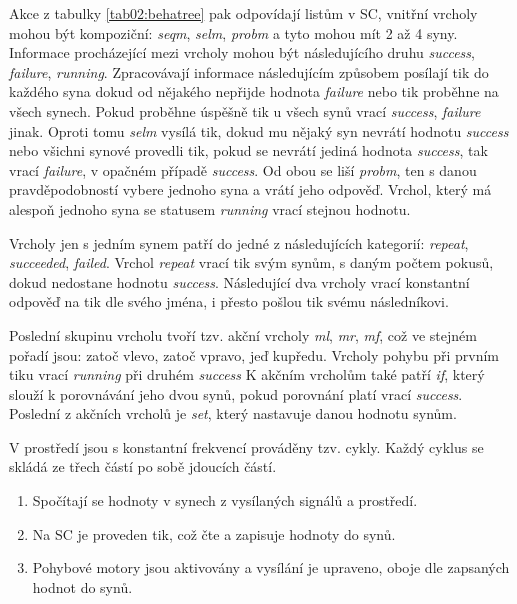 \par
Akce z tabulky \ref{tab02:behatree} pak odpovídají listům v SC, vnitřní vrcholy mohou být kompoziční: \textit{seqm}, \textit{selm}, \textit{probm} a tyto mohou mít 2 až 4 syny. Informace procházející mezi vrcholy mohou být následujícího druhu \textit{success}, \textit{failure}, \textit{running}. Zpracovávají informace následujícím způsobem posílají tik do každého syna dokud od nějakého nepřijde hodnota \textit{failure} nebo tik proběhne na všech synech. Pokud proběhne úspěšně tik u všech synů vrací \textit{success}, \textit{failure} jinak. Oproti tomu \textit{selm} vysílá tik, dokud mu nějaký syn nevrátí hodnotu \textit{success} nebo všichni synové provedli tik, pokud se nevrátí jediná hodnota \textit{success}, tak vrací \textit{failure}, v opačném případě \textit{success}. Od obou se liší \textit{probm}, ten s danou pravděpodobností vybere jednoho syna a vrátí jeho odpověď. Vrchol, který má alespoň jednoho syna se statusem \textit{running} vrací stejnou hodnotu. \par
Vrcholy jen s jedním synem patří do jedné z následujících kategorií: \textit{repeat}, \textit{succeeded}, \textit{failed}. Vrchol \textit{repeat} vrací tik svým synům, s daným počtem pokusů, dokud nedostane hodnotu \textit{success}. Následující dva vrcholy vrací konstantní odpověď na tik dle svého jména, i přesto pošlou tik svému následníkovi. \par
Poslední skupinu vrcholu tvoří tzv. akční vrcholy \textit{ml}, \textit{mr}, \textit{mf}, což ve stejném pořadí jsou: zatoč vlevo, zatoč vpravo, jeď kupředu. Vrcholy pohybu při prvním tiku vrací \textit{running} při druhém \textit{success} K akčním vrcholům také patří \textit{if}, který slouží k porovnávání jeho dvou synů, pokud porovnání platí vrací \textit{success}. Poslední z akčních vrcholů je \textit{set}, který nastavuje danou hodnotu synům. 
\par
V prostředí jsou s konstantní frekvencí prováděny tzv.  cykly. Každý cyklus se skládá ze třech částí po sobě jdoucích částí.  
\par
\begin{enumerate}
    \item Spočítají se hodnoty v synech z vysílaných signálů a prostředí. 
    \item Na SC je proveden tik, což čte a zapisuje hodnoty do synů. 
    \item Pohybové motory jsou aktivovány a vysílání je upraveno, oboje dle zapsaných hodnot do synů.
\end{enumerate}
